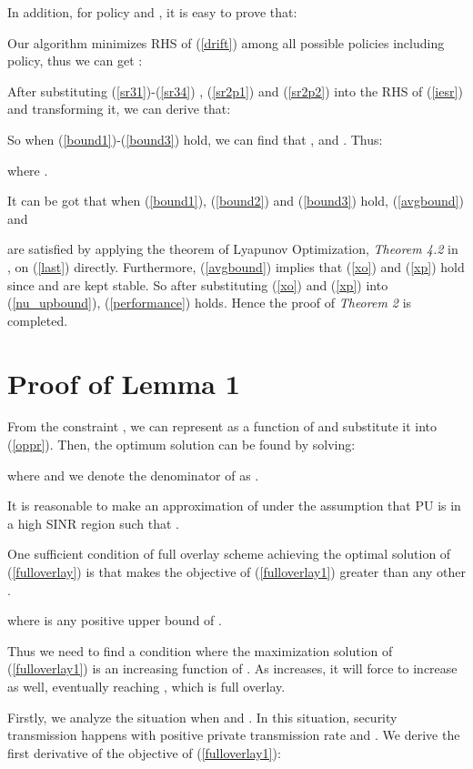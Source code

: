 \documentclass[journal]{IEEEtran}
\begin{document}
In addition, for policy  and , it is easy to prove that:




Our algorithm minimizes RHS of (\ref{drift})  among all possible policies including  policy, thus we can get :


After substituting (\ref{sr31})-(\ref{sr34}) , (\ref{sr2p1}) and (\ref{sr2p2}) into the RHS of (\ref{iesr}) and
transforming  it,  we can derive that:

So when (\ref{bound1})-(\ref{bound3}) hold, we can find   that
,
 and
. Thus:

where .

It can be got that when (\ref{bound1}), (\ref{bound2}) and (\ref{bound3}) hold, (\ref{avgbound}) and

 are satisfied by applying the theorem of Lyapunov Optimization, \emph{Theorem 4.2} in \cite{neely2010stochastic}, on (\ref{last})
directly.  Furthermore, (\ref{avgbound}) implies that (\ref{xo}) and (\ref{xp}) hold since  and  are kept stable.  So after substituting  (\ref{xo}) and (\ref{xp}) into (\ref{nu_upbound}),  (\ref{performance}) holds. Hence the proof of \emph{Theorem 2} is completed.





\section{Proof of Lemma 1}
From the constraint , we can represent  as a function of   and substitute it  into
(\ref{oppr}). Then, the optimum solution can be found by solving:

where
 and  we denote the denominator of
 as .

It is reasonable to make an approximation of  under the assumption that PU is in a high SINR region such
that .

 One sufficient condition of full overlay scheme achieving the optimal solution of (\ref{fulloverlay}) is that 
 makes the objective of (\ref{fulloverlay1}) greater than any other .

where  is any positive upper bound of .

Thus we need to find a condition where the maximization solution of (\ref{fulloverlay1})  is an increasing function of
. As  increases, it will force  to increase as well, eventually
reaching , which is full overlay.

Firstly, we analyze the situation when  and . In this situation, security transmission
happens with
positive private transmission rate and
. We derive the first
derivative of the objective of (\ref{fulloverlay1}):
\end{document}

